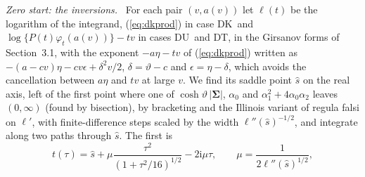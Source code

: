 \documentclass[ecta,nameyear,final,supplement]{econsocart}
\newcommand{\iu}{{\mathrm i}}
\newcommand{\Fk}{\textsf{\upshape DK}}
\newcommand{\Fu}{\textsf{\upshape DU}}
\newcommand{\Ft}{\textsf{\upshape DT}}
\newcommand{\bSig}{\boldsymbol{\Sigma}}
\theoremstyle{plain}
\theoremstyle{definition}
\newcommand{\runin}[1]{\par\medskip\noindent\textit{#1.}\ \ignorespaces}
\begin{document}
\runin{Zero start: the inversions}  For each pair $(v,a(v))$ let $\ell(t)$ be the logarithm of the integrand, (\ref{eq:dkprod}) in case \Fk\ and $\log\{P(t)\varphi_t(a(v))\}-tv$ in cases \Fu\ and \Ft, in the Girsanov forms of Section~3.1, with the exponent $-a\eta-tv$ of (\ref{eq:dkprod}) written as $-(a-cv)\eta-cv\epsilon+\delta^2v/2$, $\delta=\vartheta-c$ and $\epsilon=\eta-\delta$, which avoids the cancellation between $a\eta$ and $tv$ at large $v$.  We find its saddle point $\hat s$ on the real axis, left of the first point where one of $\cosh\vartheta\,|\bSig|$, $\alpha_0$ and $\alpha_1^2+4\alpha_0\alpha_2$ leaves $(0,\infty)$ (found by bisection), by bracketing and the Illinois variant of regula falsi on $\ell'$, with finite-difference steps scaled by the width $\ell''(\hat s)^{-1/2}$, and integrate along two paths through $\hat s$.  The first is
\[
t(\tau)=\hat s+\mu\frac{\tau^2}{(1+\tau^2/16)^{1/2}}-2\iu\mu\tau,\qquad\mu=\frac1{2\ell''(\hat s)^{1/2}},
\]
\end{document}
